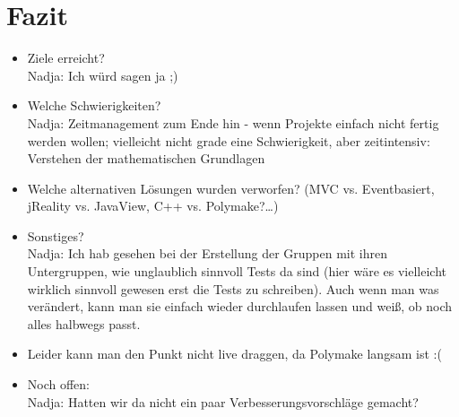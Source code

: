 \section{Fazit}
    \begin{itemize}
        \item Ziele erreicht?\\
        Nadja: Ich würd sagen ja ;)
        \item Welche Schwierigkeiten?\\
   		Nadja: Zeitmanagement zum Ende hin - wenn Projekte einfach nicht fertig werden wollen; vielleicht nicht grade eine Schwierigkeit, aber zeitintensiv: Verstehen der mathematischen Grundlagen
        \item Welche alternativen Lösungen wurden verworfen? (MVC vs. Eventbasiert, jReality vs. JavaView, C++ vs. Polymake?\dots)
        \item Sonstiges?\\
        Nadja: Ich hab gesehen bei der Erstellung der Gruppen mit ihren Untergruppen, wie unglaublich sinnvoll Tests da sind (hier wäre es vielleicht wirklich sinnvoll gewesen erst die Tests zu schreiben). Auch wenn man was verändert, kann man sie einfach wieder durchlaufen lassen und weiß, ob noch alles halbwegs passt.
         \item Leider kann man den Punkt nicht live draggen, da Polymake langsam ist :(
        \item Noch offen:\\
        Nadja: Hatten wir da nicht ein paar Verbesserungsvorschläge gemacht?
            
    \end{itemize}

